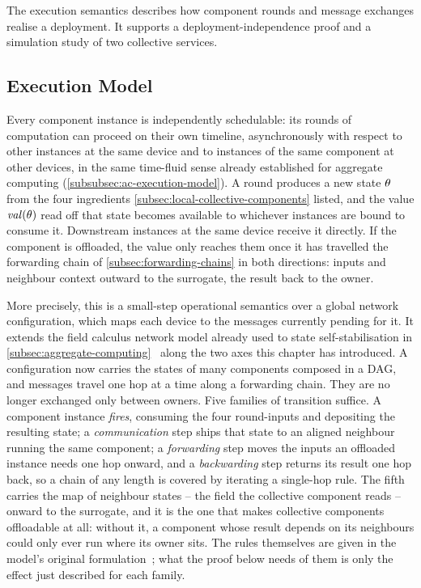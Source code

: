 The execution semantics describes how component rounds and message exchanges realise a deployment.
It supports a deployment-independence proof and a simulation study of two collective services.

\subsection{Execution Model}
\label{subsec:pulverization-execution-model}

Every component instance is independently schedulable:
its rounds of computation can proceed on their own timeline,
asynchronously with respect to other instances at the same device and to instances of the same component at other devices,
in the same time-fluid sense already established for aggregate computing (\cref{subsubsec:ac-execution-model}).
%
A round produces a new state $\theta$ from the four ingredients \cref{subsec:local-collective-components} listed,
and the value $\mathit{val}(\theta)$ read off that state becomes available to whichever instances are bound to consume it.
%
Downstream instances at the same device receive it directly.
%
If the component is offloaded, the value only reaches them once it has travelled the forwarding chain of \cref{subsec:forwarding-chains} in both directions:
inputs and neighbour context outward to the surrogate, the result back to the owner.

More precisely, this is a small-step operational semantics over a global network configuration,
which maps each device to the messages currently pending for it.
%
It extends the field calculus network model already used to state self-stabilisation in \cref{subsec:aggregate-computing}~\cite{DBLP:journals/tomacs/ViroliABDP18} along the two axes this chapter has introduced.
A configuration now carries the states of many components composed in a \ac{DAG},
and messages travel one hop at a time along a forwarding chain.
They are no longer exchanged only between owners.
%
Five families of transition suffice.
A component instance \emph{fires}, consuming the four round-inputs and depositing the resulting state;
a \emph{communication} step ships that state to an aligned neighbour running the same component;
a \emph{forwarding} step moves the inputs an offloaded instance needs one hop onward,
and a \emph{backwarding} step returns its result one hop back,
so a chain of any length is covered by iterating a single-hop rule.
%
The fifth carries the map of neighbour states -- the field the collective component reads -- onward to the surrogate,
and it is the one that makes collective components offloadable at all:
without it, a component whose result depends on its neighbours could only ever run where its owner sits.
The rules themselves are given in the model's original formulation~\cite{DBLP:conf/acsos/FarabegoliVC24};
what the proof below needs of them is only the effect just described for each family.

